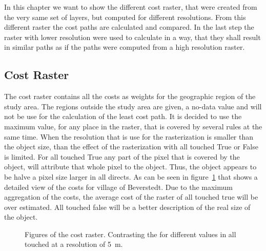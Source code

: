 
In this chapter we want to show the different cost raster, that were created from the very same set of layers,
but computed for different resolutions.
From this different raster the cost paths are calculated and compared.
In the last step the raster with lower resolution were used to calculate in a way, that they shall result in
similar paths as if the paths were computed from a high resolution raster.
\subsection{Cost Raster}\label{subsec:cost-raster}

The cost raster contains all the costs as weights for the geographic region of the study area.
The regions outside the study area are given, a no-data value and will not be use for the calculation of the least cost path.
It is decided to use the maximum value, for any place in the raster, that is covered by several rules at the same time.
When the resolution that is use for the rasterization is smaller than the object size, than the effect of the rasterization with all touched True or False is limited.
For all touched True any part of the pixel that is covered by the object, will attribute that whole pixel to the object.
Thus, the object appears to be halve a pixel size larger in all directs.
As can be seen in figure~\ref{fig:costs_5m} that shows a detailed view of the costs for village of Beverstedt.
Due to the maximum aggregation of the costs, the average cost of the raster of all touched true will be over estimated.
All touched false will be a better description of the real size of the object.
\begin{figure}
	\centering

	\qquad
	\caption{Figures of the cost raster. Contrasting the for different values in all touched at a resolution of 5~m.}
	\label{fig:costs_5m}
\end{figure}

